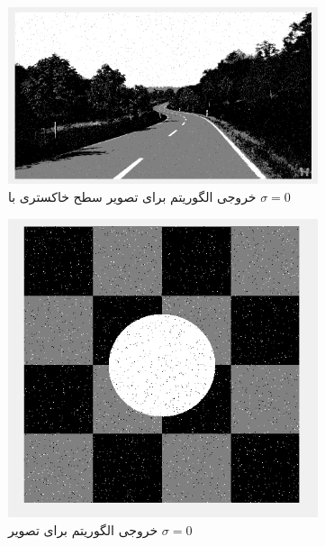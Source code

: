 \documentclass[11.5pt,a4paper]{article}
\begin{document}
\begin{figure}[h]
\center
	\begin{subfigure}{0.4\textwidth}
	\includegraphics[scale=0.2]{Imgs/iter9_Gray_Classification.png}
	\caption{خروجی الگوریتم برای تصویر سطح خاکستری با $\sigma=0$}
	\end{subfigure}
	\begin{subfigure}{0.4\textwidth}
	\includegraphics[scale=0.3]{Imgs/MRF_S01_Res.png}
	\caption{خروجی الگوریتم برای تصویر  $\sigma=0$}
	\end{subfigure}	
	\begin{subfigure}{0.4\textwidth}

\end{subfigure}
\end{figure}
\end{document}
